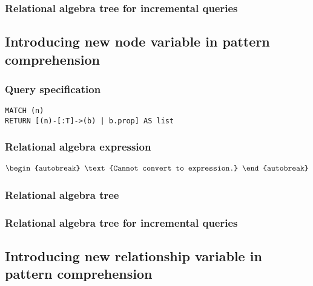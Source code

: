 \subsubsection*{Relational algebra tree for incremental queries}


\subsection{Introducing new node variable in pattern comprehension}

\subsubsection*{Query specification}

\begin{lstlisting}
MATCH (n)
RETURN [(n)-[:T]->(b) | b.prop] AS list
\end{lstlisting}

\subsubsection*{Relational algebra expression}

\begin{align*}
\begin{autobreak}
\text{Cannot convert to expression.}
\end{autobreak}
\end{align*}

\subsubsection*{Relational algebra tree}


\subsubsection*{Relational algebra tree for incremental queries}


\subsection{Introducing new relationship variable in pattern comprehension}

